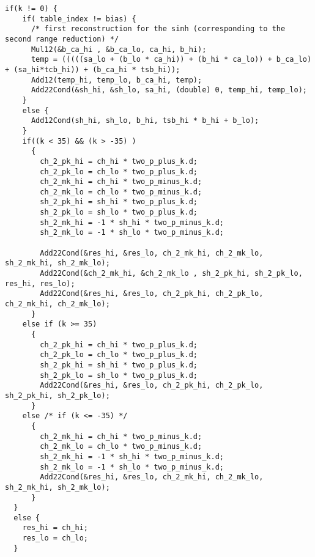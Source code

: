 \begin{lstlisting}[caption={Procedure \texttt{cosh\_quick} - reconstruction},firstnumber=77]
  if(k != 0) {
    if( table_index != bias) {
      /* first reconstruction for the sinh (corresponding to the second range reduction) */
      Mul12(&b_ca_hi , &b_ca_lo, ca_hi, b_hi);
      temp = (((((sa_lo + (b_lo * ca_hi)) + (b_hi * ca_lo)) + b_ca_lo) + (sa_hi*tcb_hi)) + (b_ca_hi * tsb_hi));
      Add12(temp_hi, temp_lo, b_ca_hi, temp);
      Add22Cond(&sh_hi, &sh_lo, sa_hi, (double) 0, temp_hi, temp_lo);
    }
    else {
      Add12Cond(sh_hi, sh_lo, b_hi, tsb_hi * b_hi + b_lo);
    }
    if((k < 35) && (k > -35) )
      {
        ch_2_pk_hi = ch_hi * two_p_plus_k.d;
        ch_2_pk_lo = ch_lo * two_p_plus_k.d;
        ch_2_mk_hi = ch_hi * two_p_minus_k.d;
        ch_2_mk_lo = ch_lo * two_p_minus_k.d;
        sh_2_pk_hi = sh_hi * two_p_plus_k.d;
        sh_2_pk_lo = sh_lo * two_p_plus_k.d;
        sh_2_mk_hi = -1 * sh_hi * two_p_minus_k.d;
        sh_2_mk_lo = -1 * sh_lo * two_p_minus_k.d;
        
        Add22Cond(&res_hi, &res_lo, ch_2_mk_hi, ch_2_mk_lo, sh_2_mk_hi, sh_2_mk_lo);
        Add22Cond(&ch_2_mk_hi, &ch_2_mk_lo , sh_2_pk_hi, sh_2_pk_lo, res_hi, res_lo);
        Add22Cond(&res_hi, &res_lo, ch_2_pk_hi, ch_2_pk_lo, ch_2_mk_hi, ch_2_mk_lo);
      } 
    else if (k >= 35) 
      {
        ch_2_pk_hi = ch_hi * two_p_plus_k.d;
        ch_2_pk_lo = ch_lo * two_p_plus_k.d;
        sh_2_pk_hi = sh_hi * two_p_plus_k.d;
        sh_2_pk_lo = sh_lo * two_p_plus_k.d;
        Add22Cond(&res_hi, &res_lo, ch_2_pk_hi, ch_2_pk_lo, sh_2_pk_hi, sh_2_pk_lo);
      }
    else /* if (k <= -35) */
      {
        ch_2_mk_hi = ch_hi * two_p_minus_k.d;
        ch_2_mk_lo = ch_lo * two_p_minus_k.d;
        sh_2_mk_hi = -1 * sh_hi * two_p_minus_k.d;
        sh_2_mk_lo = -1 * sh_lo * two_p_minus_k.d;
        Add22Cond(&res_hi, &res_lo, ch_2_mk_hi, ch_2_mk_lo, sh_2_mk_hi, sh_2_mk_lo);
      }
  }
  else {
    res_hi = ch_hi;
    res_lo = ch_lo;
  }

\end{lstlisting}

